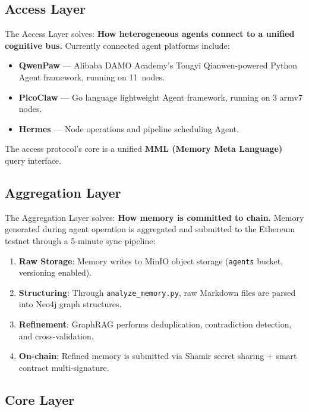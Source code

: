 \documentclass[11pt,a4paper]{article}
\begin{document}
\subsection{Access Layer}
\label{sub:access}

The Access Layer solves: \textbf{How heterogeneous agents connect to a unified cognitive bus.}
Currently connected agent platforms include:
\begin{itemize}
  \item \textbf{QwenPaw} --- Alibaba DAMO Academy's Tongyi Qianwen-powered Python Agent framework, running on 11~nodes.
  \item \textbf{PicoClaw} --- Go language lightweight Agent framework, running on 3 armv7 nodes.
  \item \textbf{Hermes} --- Node operations and pipeline scheduling Agent.
\end{itemize}

The access protocol's core is a unified \textbf{MML (Memory Meta Language)} query interface.

\subsection{Aggregation Layer}
\label{sub:aggregation}

The Aggregation Layer solves: \textbf{How memory is committed to chain.}
Memory generated during agent operation is aggregated and submitted to the Ethereum testnet through a 5-minute sync pipeline:

\begin{enumerate}
  \item \textbf{Raw Storage}: Memory writes to MinIO object storage (\texttt{agents} bucket, versioning enabled).
  \item \textbf{Structuring}: Through \texttt{analyze\_memory.py}, raw Markdown files are parsed into Neo4j graph structures.
  \item \textbf{Refinement}: GraphRAG performs deduplication, contradiction detection, and cross-validation.
  \item \textbf{On-chain}: Refined memory is submitted via Shamir secret sharing + smart contract multi-signature.
\end{enumerate}

\subsection{Core Layer}
\label{sub:core}
\end{document}
